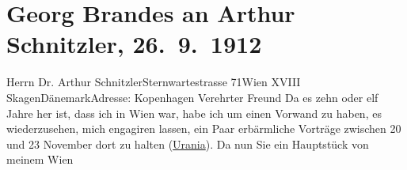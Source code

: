 

         
         \renewcommand{\erwaehntePersonen}{Personen: Richard Beer-Hofmann, Georg Brandes, Hugo von Hofmannsthal, Jakob Wassermann}
         \renewcommand{\erwaehnteOrte}{Orte: Dänemark, Kopenhagen, Skagen, Sternwartestraße 71, Urania, Wien, XVIII., Währing}
         \renewcommand{\erwaehnteWerke}{}
               \section[Georg Brandes an Arthur Schnitzler, 26. 9. 1912]{ Georg Brandes an Arthur Schnitzler, 26. 9. 1912}\nopagebreak{}\rehead{ }\begin{ledgroupsized}[t]{13cm}\normalsize\beginnumbering{} \toendnotes[C]{\smallbreak\pagebreak[2]} 
\toendnotes[C]{\smallbreak}\pstart{}{\pb}Herrn Dr. Arthur
                  Schnitzler\pend{}\pstart{}Sternwartestrasse 71\pend{}\pstart{}Wien XVIII\pend{}{\bigskip}\pstart
           \raggedleft{}{\pb}\label{K_L02091-1v}\label{K_L02091-1h}{ }SkagenDänemarkAdresse: Kopenhagen\pend
           \pstart{}Verehrter Freund\pend\pstart
           Da es zehn oder elf Jahre her ist, dass ich in Wien war, habe ich um einen Vorwand zu haben, es wiederzusehen, mich
               engagiren lassen, ein Paar erbärmliche Vorträge zwischen 20{ }\strikeout{\textcolor{gray}{×}} und 23 November dort zu halten (\uline{Urania}). Da nun Sie ein Hauptstück von meinem Wien

\end{ledgroupsized}
